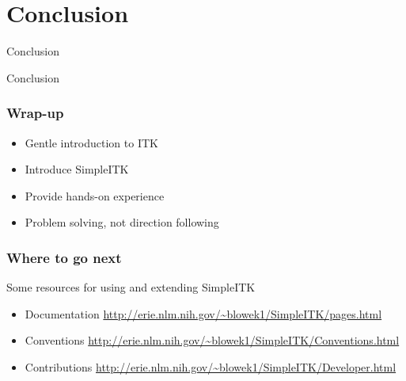 \section{Conclusion}

\begin{frame}{Conclusion}
\fontsize{36pt}{36pt}\selectfont
\center
\begin{center}
Conclusion
\end{center}
\end{frame}

\begin{frame}
\frametitle{Wrap-up}
\begin{itemize}
  \item Gentle introduction to ITK
  \item Introduce SimpleITK
  \item Provide hands-on experience
  \item Problem solving, not direction following
\end{itemize}
\end{frame}

\begin{frame}
\frametitle{Where to go next}
Some resources for using and extending SimpleITK
\small
\begin{itemize}
  \item Documentation \url{http://erie.nlm.nih.gov/~blowek1/SimpleITK/pages.html}
  \item Conventions \url{http://erie.nlm.nih.gov/~blowek1/SimpleITK/Conventions.html}
  \item Contributions \url{http://erie.nlm.nih.gov/~blowek1/SimpleITK/Developer.html}
\end{itemize}
\normalsize
\end{frame}
